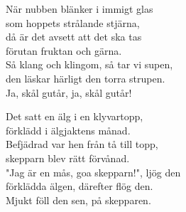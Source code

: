 \documentclass[a6paper,10pt]{article}
\begin{document}
\begin{center}
\end{center}
När nubben blänker i immigt glas \\
som hoppets strålande stjärna, \\
då är det avsett att det ska tas \\
förutan fruktan och gärna. \\
Så klang och klingom, så tar vi supen, \\
den läskar härligt den torra strupen. \\
Ja, skål gutår, ja, skål gutår! 

\begin{center}
\end{center}
Det satt en älg i en klyvartopp,\\
förklädd i älgjaktens månad.\\
Befjädrad var hen från tå till topp,\\
skepparn blev rätt förvånad.\\
"Jag är en mås, goa skepparn!", ljög den\\
förklädda älgen, därefter flög den.\\
Mjukt föll den sen, på skepparen.
\end{document}
